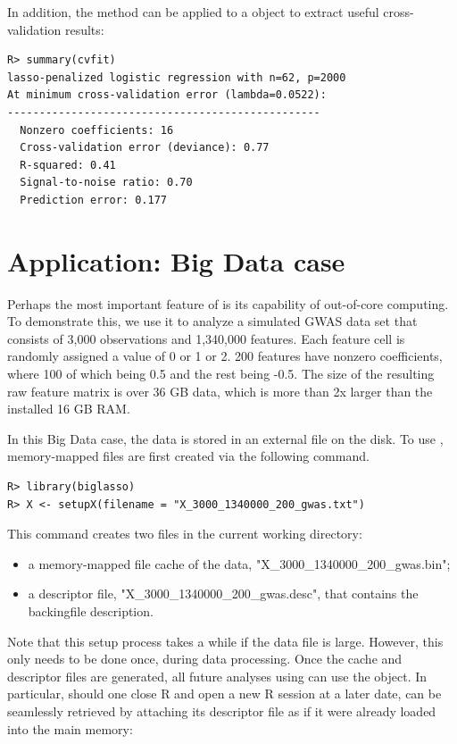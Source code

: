 In addition, the  method can be applied to a  object to extract useful cross-validation results:
\begin{verbatim}
R> summary(cvfit)
lasso-penalized logistic regression with n=62, p=2000
At minimum cross-validation error (lambda=0.0522):
-------------------------------------------------
  Nonzero coefficients: 16
  Cross-validation error (deviance): 0.77
  R-squared: 0.41
  Signal-to-noise ratio: 0.70
  Prediction error: 0.177
\end{verbatim}

\section{Application: Big Data case}

Perhaps the most important feature of  is its capability of out-of-core computing. To demonstrate this, we use it to analyze a simulated GWAS data set that consists of 3,000 observations and 1,340,000 features. Each feature cell is randomly assigned a value of 0 or 1 or 2. 200 features have nonzero coefficients, where 100 of which being 0.5 and the rest being -0.5. The size of the resulting raw feature matrix is over 36 GB data, which is more than 2x larger than the installed 16 GB RAM.

In this Big Data case, the data is stored in an external file on the disk. To use , memory-mapped files are first created via the following command.

\begin{verbatim}
R> library(biglasso)
R> X <- setupX(filename = "X_3000_1340000_200_gwas.txt")
\end{verbatim}

This command creates two files in the current working directory: 
\begin{itemize}
\item a memory-mapped file cache of the data, "X\_3000\_1340000\_200\_gwas.bin"; 
\item a descriptor file, "X\_3000\_1340000\_200\_gwas.desc", that contains the backingfile description.
\end{itemize}

Note that this setup process takes a while if the data file is large. However, this only needs to be done once, during data processing.  Once the cache and descriptor files are generated, all future analyses using  can use the  object.  In particular, should one close R and open a new R session at a later date,  can be seamlessly retrieved by attaching its descriptor file as if it were already loaded into the main memory:


